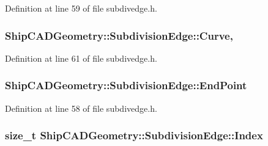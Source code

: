 Definition at line 59 of file subdivedge.\-h.

\hypertarget{classShipCADGeometry_1_1SubdivisionEdge_abdc110088d3e486395a31dd7c7328dd4}{
\subsubsection[{Curve}]{ Ship\-C\-A\-D\-Geometry\-::\-Subdivision\-Edge\-::\-Curve\hspace{0.3cm}{\ttfamily [read]}, {\ttfamily [write]}}}\label{classShipCADGeometry_1_1SubdivisionEdge_abdc110088d3e486395a31dd7c7328dd4}


Definition at line 61 of file subdivedge.\-h.

\hypertarget{classShipCADGeometry_1_1SubdivisionEdge_aaec4f19ba8274a3b501a06fedb0658cb}{
\subsubsection[{End\-Point}]{ Ship\-C\-A\-D\-Geometry\-::\-Subdivision\-Edge\-::\-End\-Point\hspace{0.3cm}{\ttfamily [read]}}}\label{classShipCADGeometry_1_1SubdivisionEdge_aaec4f19ba8274a3b501a06fedb0658cb}


Definition at line 58 of file subdivedge.\-h.

\hypertarget{classShipCADGeometry_1_1SubdivisionEdge_a5d959fb5043fcad1c24e603b50e9fa95}{
\subsubsection[{Index}]{\setlength{\rightskip}{0pt plus 5cm}size\-\_\-t Ship\-C\-A\-D\-Geometry\-::\-Subdivision\-Edge\-::\-Index\hspace{0.3cm}{\ttfamily [read]}}}\label{classShipCADGeometry_1_1SubdivisionEdge_a5d959fb5043fcad1c24e603b50e9fa95}


